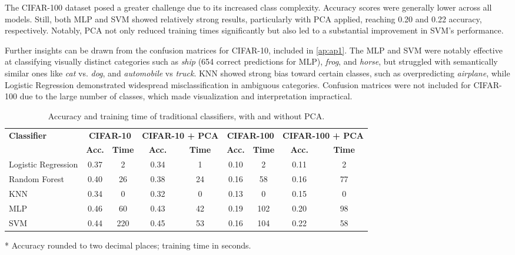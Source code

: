 \documentclass[journal,article,submit,pdftex,moreauthors]{Definitions/mdpi}
\begin{document}
The CIFAR-100 dataset posed a greater challenge due to its increased class complexity. Accuracy scores were generally lower across all models. Still, both MLP and SVM showed relatively strong results, particularly with PCA applied, reaching 0.20 and 0.22 accuracy, respectively. Notably, PCA not only reduced training times significantly but also led to a substantial improvement in SVM’s performance.

Further insights can be drawn from the confusion matrices for CIFAR-10, included in \autoref{ap:ap1}. The MLP and SVM were notably effective at classifying visually distinct categories such as \textit{ship} (654 correct predictions for MLP), \textit{frog}, and \textit{horse}, but struggled with semantically similar ones like \textit{cat} vs. \textit{dog}, and \textit{automobile} vs \textit{truck}. KNN showed strong bias toward certain classes, such as overpredicting \textit{airplane}, while Logistic Regression demonstrated widespread misclassification in ambiguous categories. Confusion matrices were not included for CIFAR-100 due to the large number of classes, which made visualization and interpretation impractical.


\begin{table}[H]
\caption{Accuracy and training time of traditional classifiers, with and without PCA.\label{tab:classifiers_results}}
\centering
\begin{tabular}{lcccccccc}
\toprule
\multirow{2}{*}{\textbf{Classifier}} & \multicolumn{2}{c}{\textbf{CIFAR-10}} & \multicolumn{2}{c}{\textbf{CIFAR-10 + PCA}} & \multicolumn{2}{c}{\textbf{CIFAR-100}} & \multicolumn{2}{c}{\textbf{CIFAR-100 + PCA}} \\
\cmidrule(lr){2-3} \cmidrule(lr){4-5} \cmidrule(lr){6-7} \cmidrule(lr){8-9}
 & \textbf{Acc.} & \textbf{Time} & \textbf{Acc.} & \textbf{Time} & \textbf{Acc.} & \textbf{Time} & \textbf{Acc.} & \textbf{Time} \\
\midrule
Logistic Regression & 0.37 & 2 & 0.34 & 1 & 0.10 & 2 & 0.11 & 2 \\
Random Forest       & 0.40 & 26 & 0.38 & 24 & 0.16 & 58 & 0.16 & 77 \\
KNN                 & 0.34 & 0 & 0.32 & 0 & 0.13 & 0 & 0.15 & 0 \\
MLP                 & 0.46 & 60 & 0.43 & 42 & 0.19 & 102 & 0.20 & 98 \\
SVM                 & 0.44 & 220 & 0.45 & 53 & 0.16 & 104 & 0.22 & 58 \\
\bottomrule
\end{tabular}
\vspace{0.5em}

\noindent\footnotesize{* Accuracy rounded to two decimal places; training time in seconds.}
\end{table}
\end{document}
